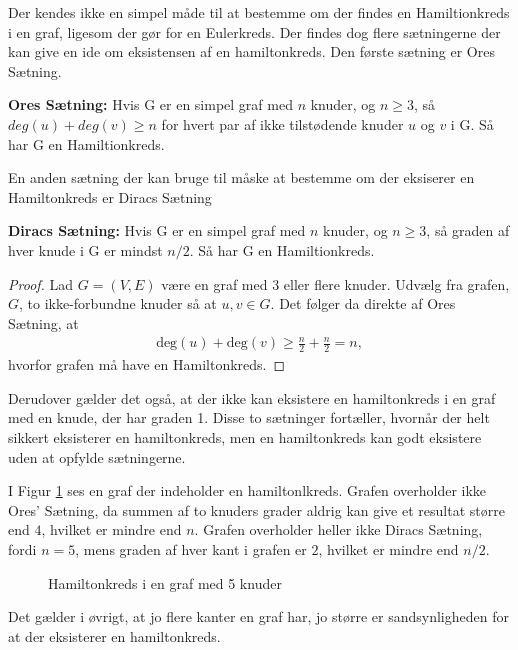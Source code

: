 Der kendes ikke en simpel måde til at bestemme om der findes en Hamiltionkreds i en graf, ligesom der gør for en Eulerkreds. 
Der findes dog flere sætningerne der kan give en ide om eksistensen af en hamiltonkreds.
Den første sætning er Ores Sætning.

\begin{thm} \label{ores_thm}
\textbf{Ores Sætning:} 
Hvis G er en simpel graf med $n$ knuder, og $n\geq3$, så\\ $deg(u)+deg(v)\geq n$ for hvert par af ikke tilstødende knuder $u$ og $v$ i G. 
Så har G en Hamiltionkreds. 
\end{thm}

En anden sætning der kan bruge til måske at bestemme om der eksiserer en Hamiltonkreds er Diracs Sætning 

\begin{thm} \label{diracs_thm}
\textbf{Diracs Sætning:} 
Hvis G er en simpel graf med $n$ knuder, og $n\geq3$, så graden af hver knude i G er mindst $n/2$. 
Så har G en Hamiltionkreds.  
\end{thm}

\begin{proof}
Lad $G=(V,E)$ være en graf med 3 eller flere knuder. Udvælg fra grafen, $G$, to ikke-forbundne knuder så at $u,v \in G$. Det følger da direkte af Ores Sætning, at
\begin{align*}
\textrm{deg}(u) + \textrm{deg}(v) \geq \frac{n}{2} + \frac{n}{2} = n,
\end{align*}
hvorfor grafen må have en Hamiltonkreds.
\end{proof}

Derudover gælder det også, at der ikke kan eksistere en hamiltonkreds i en graf med en knude, der har graden 1. 
Disse to sætninger fortæller, hvornår der helt sikkert eksisterer en hamiltonkreds, men en hamiltonkreds kan godt eksistere uden at opfylde sætningerne. 

\begin{exmp}
I Figur \ref{pentagon} ses en graf der indeholder en hamiltonlkreds.
Grafen overholder ikke Ores' Sætning, da summen af to knuders grader aldrig kan give et resultat større end $4$, hvilket er mindre end $n$.
Grafen overholder heller ikke Diracs Sætning, fordi $n=5$, mens graden af hver kant i grafen er $2$, hvilket er mindre end $n/2$.


\begin{figure}
\centering

\caption{Hamiltonkreds i en graf med 5 knuder}
\label{pentagon}
\end{figure}

\end{exmp}

Det gælder i øvrigt, at jo flere kanter en graf har, jo større er sandsynligheden for at der eksisterer en hamiltonkreds. 